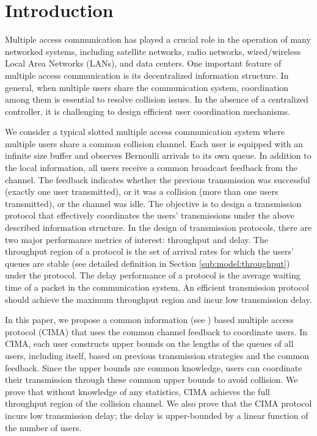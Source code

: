 \documentclass[onecolumn,draftcls]{IEEEtran}
\newcommand{\g}{\text{CIMA}}
\begin{document}
\IEEEpeerreviewmaketitle



\section{Introduction}

Multiple access communication has played a crucial role in the operation of many networked systems, including satellite networks, radio networks, wired/wireless Local Area Networks (LANs), and data centers.
One important feature of multiple access communication is its decentralized information structure.
In general, when multiple users share the communication system,
coordination among them is essential to resolve collision issues.
In the absence of a centralized controller, it is challenging to design efficient user coordination mechanisms.


We consider a typical slotted multiple access communication system where multiple users share a common collision channel.
Each user is equipped with an infinite size buffer and observes Bernoulli arrivals to its own queue.
In addition to the local information, all users receive a common broadcast feedback from the channel.
The feedback indicates whether the previous transmission was successful (exactly one user transmitted), or it was a collision (more than one users transmitted), or the channel was idle. The objective is to design a transmission protocol that effectively coordinates the users' transmissions under the above described information structure.
In the design of transmission protocols, there are two major performance metrics of interest: throughput and delay.
The throughput region of a protocol is the set of arrival rates for which the users' queues are stable (see detailed definition in Section \ref{sub:model:throughput}) under the protocol. The delay performance of a protocol is the average waiting time of a packet in the communication system. An efficient transmission protocol should achieve the maximum throughput region and incur low transmission delay.


In this paper, we propose a common information (see \cite{nayyar2013decentralized,nayyar2014common}) based multiple access protocol ($\g$) that uses the common channel feedback to coordinate users. 
In $\g$, each user constructs upper bounds on the lengths of the queues of all users, including itself, based on previous transmission strategies and the common feedback.
Since the upper bounds are common knowledge, users can coordinate their transmission through these common upper bounds to avoid collision. 
We prove that without knowledge of any statistics, $\g$ achieves the full throughput region of the collision channel.
We also prove that the $\g$ protocol incurs low transmission delay; the delay is upper-bounded by a linear function of the number of users.
\end{document}
